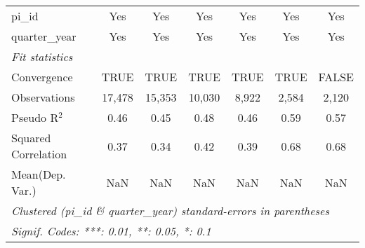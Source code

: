 \begin{tabular}{lcccccc}
   pi\_id                                                     & Yes            & Yes            & Yes           & Yes           & Yes           & Yes\\  
   quarter\_year                                              & Yes            & Yes            & Yes           & Yes           & Yes           & Yes\\  
   \midrule
   \emph{Fit statistics}\\
   Convergence                                                &TRUE            & TRUE           & TRUE          & TRUE          & TRUE          & FALSE\\  
   Observations                                               & 17,478         & 15,353         & 10,030        & 8,922         & 2,584         & 2,120\\  
   Pseudo R$^2$                                               & 0.46           & 0.45           & 0.48          & 0.46          & 0.59          & 0.57\\  
   Squared Correlation                                        & 0.37           & 0.34           & 0.42          & 0.39          & 0.68          & 0.68\\  
Mean(Dep. Var.) & NaN & NaN & NaN & NaN & NaN & NaN \\
   \midrule \midrule
   \multicolumn{7}{l}{\emph{Clustered (pi\_id \& quarter\_year) standard-errors in parentheses}}\\
   \multicolumn{7}{l}{\emph{Signif. Codes: ***: 0.01, **: 0.05, *: 0.1}}\\
\end{tabular}
\par\endgroup
